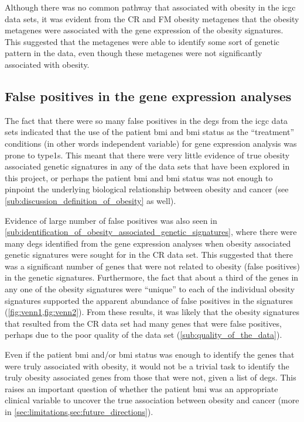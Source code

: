 Although there was no common pathway that associated with obesity in the \gls{icgc} data sets, it was evident from the CR and FM obesity metagenes that the obesity metagenes were associated with the gene expression of the obesity signatures.
This suggested that the metagenes were able to identify some sort of genetic pattern in the data, even though these metagenes were not significantly associated with obesity.

\subsection{False positives in the gene expression analyses}
\label{sub:false_positives_in_gene_expression_analyses}

The fact that there were so many false positives in the \glspl{deg} from the \gls{icgc} data sets indicated that the use of the patient \gls{bmi} and \gls{bmi} status as the ``treatment'' conditions (in other words independent variable) for gene expression analysis was prone to \Glspl{type1}.
This meant that there were very little evidence of true obesity associated genetic signatures in any of the data sets that have been explored in this project, or perhaps the patient \gls{bmi} and \gls{bmi} status was not enough to pinpoint the underlying biological relationship between obesity and cancer (see \cref{sub:discussion_definition_of_obesity} as well).

Evidence of large number of false positives was also seen in \cref{sub:identification_of_obesity_associated_genetic_signatures}, where there were many \glspl{deg} identified from the gene expression analyses when obesity associated genetic signatures were sought for in the CR data set.
This suggested that there was a significant number of genes that were not related to obesity (false positives) in the genetic signatures.
Furthermore, the fact that about a third of the genes in any one of the obesity signatures were ``unique'' to each of the individual obesity signatures supported the apparent abundance of false positives in the signatures (\cref{fig:venn1,fig:venn2}).
From these results, it was likely that the obesity signatures that resulted from the CR data set had many genes that were false positives, perhaps due to the poor quality of the data set (\cref{sub:quality_of_the_data}).

Even if the patient \gls{bmi} and/or \gls{bmi} status was enough to identify the genes that were truly associated with obesity, it would not be a trivial task to identify the truly obesity associated genes from those that were not, given a list of \glspl{deg}.
This raises an important question of whether the patient \gls{bmi} was an appropriate clinical variable to uncover the true association between obesity and cancer (more in \cref{sec:limitations,sec:future_directions}).

